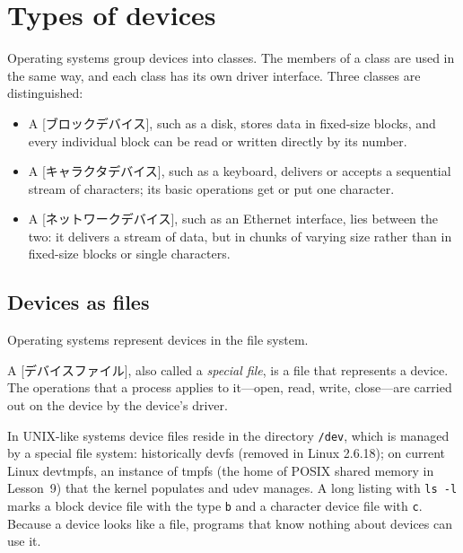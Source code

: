 \documentclass[../main.tex]{subfiles}
\begin{document}
\section{Types of devices}
\label{sec:l11-types}

Operating systems group devices into classes.  The members of a
class are used in the same way, and each class has its own driver
interface.  Three classes are distinguished:
\begin{itemize}
  \item A [ブロックデバイス], such as a disk, stores data
    in fixed-size blocks, and every individual block can be read or written
    directly by its number.
  \item A [キャラクタデバイス], such as a keyboard,
    delivers or accepts a sequential stream of characters; its basic
    operations get or put one character.
  \item A [ネットワークデバイス], such as an Ethernet
    interface, lies between the two: it delivers a stream of data, but in
    chunks of varying size rather than in fixed-size blocks or single
    characters.
\end{itemize}

\subsection{Devices as files}

Operating systems represent devices in the file system.

\begin{definition}
  A [デバイスファイル], also called a \emph{special file},
  is a file that represents a device.  The operations that a process
  applies to it---open, read, write, close---are carried out on the device
  by the device's driver.
\end{definition}

In UNIX-like systems device files reside in the directory \texttt{/dev},
which is managed by a special file system: historically devfs (removed in
Linux 2.6.18); on current Linux devtmpfs, an instance of tmpfs (the home of
POSIX shared memory in Lesson~9) that the kernel populates and udev
manages.  A long listing with
\texttt{ls -l} marks a block device file with the type \texttt{b} and a
character device file with \texttt{c}.  Because a device looks like a
file, programs that know nothing about devices can use it.
\end{document}
